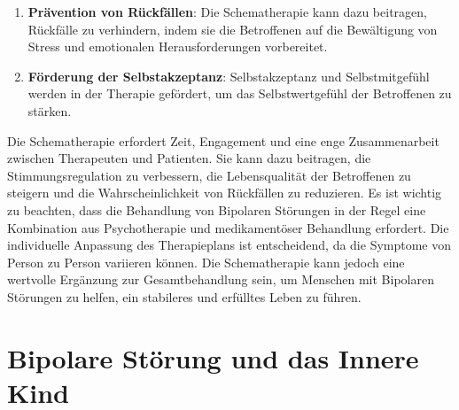 \begin{enumerate}
\item \textbf{Prävention von Rückfällen}: Die Schematherapie kann dazu beitragen, Rückfälle zu verhindern, indem sie die Betroffenen auf die Bewältigung von Stress und emotionalen Herausforderungen vorbereitet.

\item \textbf{Förderung der Selbstakzeptanz}: Selbstakzeptanz und Selbstmitgefühl werden in der Therapie gefördert, um das Selbstwertgefühl der Betroffenen zu stärken.
\end{enumerate}

Die Schematherapie erfordert Zeit, Engagement und eine enge Zusammenarbeit zwischen Therapeuten und Patienten. Sie kann dazu beitragen, die Stimmungsregulation zu verbessern, die Lebensqualität der Betroffenen zu steigern und die Wahrscheinlichkeit von Rückfällen zu reduzieren. Es ist wichtig zu beachten, dass die Behandlung von Bipolaren Störungen in der Regel eine Kombination aus Psychotherapie und medikamentöser Behandlung erfordert. Die individuelle Anpassung des Therapieplans ist entscheidend, da die Symptome von Person zu Person variieren können. Die Schematherapie kann jedoch eine wertvolle Ergänzung zur Gesamtbehandlung sein, um Menschen mit Bipolaren Störungen zu helfen, ein stabileres und erfülltes Leben zu führen.


\section{Bipolare Störung und das Innere Kind}

